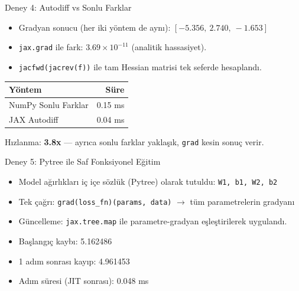 \documentclass[aspectratio=169]{beamer}
\begin{document}
\begin{frame}{Deney 4: Autodiff vs Sonlu Farklar}
  \begin{itemize}
    \item Gradyan sonucu (her iki yöntem de aynı): $[-5.356,\ 2.740,\ -1.653]$
    \item \texttt{jax.grad} ile fark: $3.69 \times 10^{-11}$ (analitik hassasiyet).
    \item \texttt{jacfwd(jacrev(f))} ile tam Hessian matrisi tek seferde hesaplandı.
  \end{itemize}
  \begin{table}
    \small
    \begin{tabular}{@{}lr@{}}
      \toprule
      Yöntem & Süre \\
      \midrule
      NumPy Sonlu Farklar & 0.15 ms \\
      JAX Autodiff & 0.04 ms \\
      \bottomrule
    \end{tabular}
  \end{table}
  Hızlanma: \textbf{3.8x} — ayrıca sonlu farklar yaklaşık, \texttt{grad} kesin sonuç verir.
\end{frame}

\begin{frame}{Deney 5: Pytree ile Saf Fonksiyonel Eğitim}
  \begin{itemize}
    \item Model ağırlıkları iç içe sözlük (Pytree) olarak tutuldu: \texttt{W1, b1, W2, b2}
    \item Tek çağrı: \texttt{grad(loss\_fn)(params, data)} $\to$ tüm parametrelerin gradyanı
    \item Güncelleme: \texttt{jax.tree.map} ile parametre-gradyan eşleştirilerek uygulandı.
  \end{itemize}
  \begin{itemize}
    \item Başlangıç kaybı: 5.162486
    \item 1 adım sonrası kayıp: 4.961453
    \item Adım süresi (JIT sonrası): 0.048 ms
  \end{itemize}
\end{frame}
\end{document}
